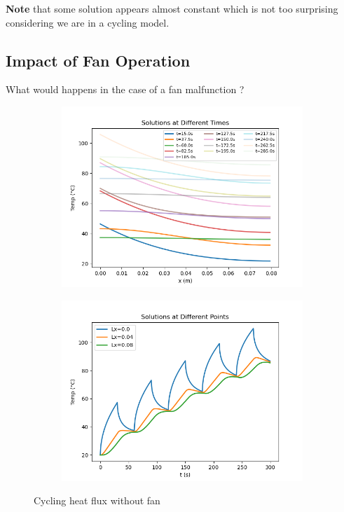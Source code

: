 \documentclass{article}
\begin{document}
\textbf{Note} that some solution appears almost constant which is not too surprising considering we are in a cycling model.

\subsection{Impact of Fan Operation}
What would happens in the case of a fan malfunction ? \\

\begin{figure}[H]
\begin{subfigure}{.5\textwidth}
  \centering
  \includegraphics[width=1\linewidth]{images/noFan.png}
  \caption{}
  \label{fig:sfig1}
\end{subfigure}
\begin{subfigure}{.5\textwidth}
  \centering
  \includegraphics[width=1\linewidth]{images/noFan2.png}
  \caption{}
\end{subfigure}
\caption{Cycling heat flux without fan}
\label{fig:fig}
\end{figure}
\end{document}
